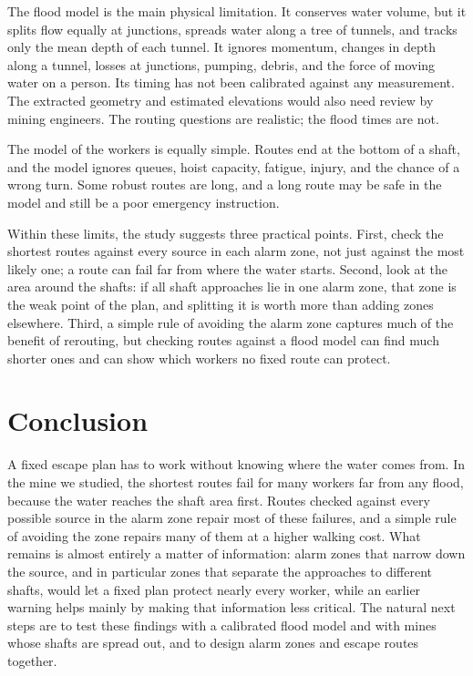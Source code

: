 \documentclass[11pt,a4paper]{article}
\begin{document}
The flood model is the main physical limitation. It conserves water volume, but it splits flow equally at junctions, spreads water along a tree of tunnels, and tracks only the mean depth of each tunnel. It ignores momentum, changes in depth along a tunnel, losses at junctions, pumping, debris, and the force of moving water on a person. Its timing has not been calibrated against any measurement. The extracted geometry and estimated elevations would also need review by mining engineers. The routing questions are realistic; the flood times are not.

The model of the workers is equally simple. Routes end at the bottom of a shaft, and the model ignores queues, hoist capacity, fatigue, injury, and the chance of a wrong turn. Some robust routes are long, and a long route may be safe in the model and still be a poor emergency instruction.

Within these limits, the study suggests three practical points. First, check the shortest routes against every source in each alarm zone, not just against the most likely one; a route can fail far from where the water starts. Second, look at the area around the shafts: if all shaft approaches lie in one alarm zone, that zone is the weak point of the plan, and splitting it is worth more than adding zones elsewhere. Third, a simple rule of avoiding the alarm zone captures much of the benefit of rerouting, but checking routes against a flood model can find much shorter ones and can show which workers no fixed route can protect.

\section{Conclusion}
A fixed escape plan has to work without knowing where the water comes from. In the mine we studied, the shortest routes fail for many workers far from any flood, because the water reaches the shaft area first. Routes checked against every possible source in the alarm zone repair most of these failures, and a simple rule of avoiding the zone repairs many of them at a higher walking cost. What remains is almost entirely a matter of information: alarm zones that narrow down the source, and in particular zones that separate the approaches to different shafts, would let a fixed plan protect nearly every worker, while an earlier warning helps mainly by making that information less critical. The natural next steps are to test these findings with a calibrated flood model and with mines whose shafts are spread out, and to design alarm zones and escape routes together.
\end{document}
